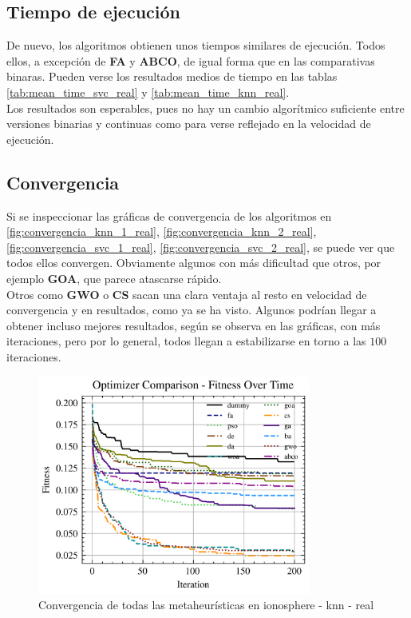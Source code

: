 \subsection{Tiempo de ejecución}
De nuevo, los algoritmos obtienen unos tiempos similares de ejecución. Todos ellos, a excepción de \textbf{FA} y \textbf{ABCO}, de igual forma que en las comparativas binaras. Pueden verse los resultados medios de tiempo en las tablas \ref{tab:mean_time_svc_real} y \ref{tab:mean_time_knn_real}.\\[6pt]
Los resultados son esperables, pues no hay un cambio algorítmico suficiente entre versiones binarias y continuas como para verse reflejado en la velocidad de ejecución.

\subsection{Convergencia}
Si se inspeccionar las gráficas de convergencia de los algoritmos en \ref{fig:convergencia_knn_1_real}, \ref{fig:convergencia_knn_2_real}, \ref{fig:convergencia_svc_1_real}, \ref{fig:convergencia_svc_2_real}, se puede ver que todos ellos convergen. Obviamente algunos con más dificultad que otros, por ejemplo \textbf{GOA}, que parece atascarse rápido.\\[6pt]
Otros como \textbf{GWO} o \textbf{CS} sacan una clara ventaja al resto en velocidad de convergencia y en resultados, como ya se ha visto. Algunos podrían llegar a obtener incluso mejores resultados, según se observa en las gráficas, con más iteraciones, pero por lo general, todos llegan a estabilizarse en torno a las $100$ iteraciones.

\begin{figure}[htp]
    \includegraphics[width=0.8\textwidth]{imagenes/fitness_charts/img/real/ionosphere/optimizers_fitness_knn.png}
    \caption{Convergencia de todas las metaheurísticas en ionosphere - knn - real}
\end{figure}

